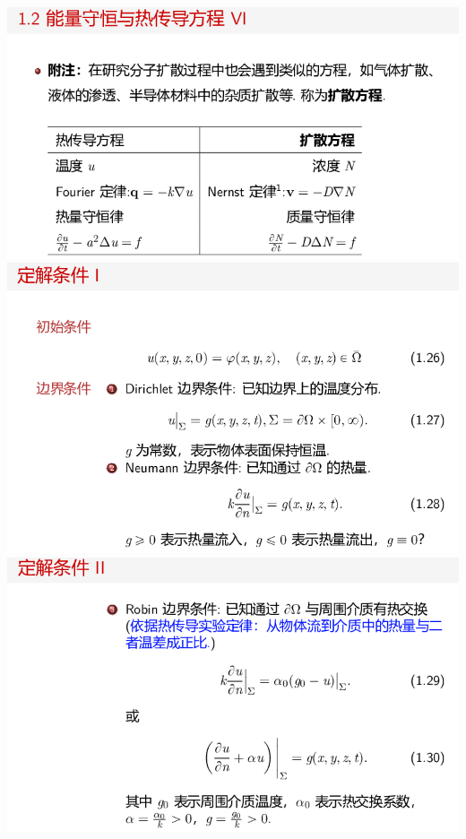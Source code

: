 \documentclass[11pt,a4paper]{ctexart}
\begin{document}
\begin{paracol}{2}
\includegraphics[width=\linewidth]{chap01_33.png}
\includegraphics[width=\linewidth]{chap01_34.png}
\includegraphics[width=\linewidth]{chap01_35.png}
\newpage


\end{paracol}
\end{document}
